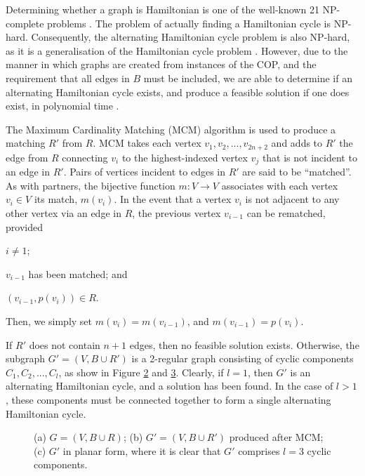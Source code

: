 \documentclass{elsarticle}
\begin{document}
Determining whether a graph is Hamiltonian is one of the well-known 21 NP-complete problems \cite{karp1972}. The problem of actually finding a Hamiltonian cycle is NP-hard. Consequently, the alternating Hamiltonian cycle problem is also NP-hard, as it is a generalisation of the Hamiltonian cycle problem \cite{haggkvist1977}. However, due to the manner in which graphs are created from instances of the COP, and the requirement that all edges in $B$ must be included, we are able to determine if an alternating Hamiltonian cycle exists, and produce a feasible solution if one does exist, in polynomial time \cite{hawa2018}.

The Maximum Cardinality Matching (MCM) algorithm is used to produce a matching $R'$ from $R$. MCM takes each vertex $v_1, v_2,...,v_{2n+2}$ and adds to $R'$ the edge from $R$ connecting $v_i$ to the highest-indexed vertex $v_j$ that is not incident to an edge in $R'$. Pairs of vertices incident to edges in $R'$ are said to be ``matched''. As with partners, the bijective function $m : V \to V$ associates with each vertex $v_i \in V$ its match, $m(v_i)$. In the event that a vertex $v_i$ is not adjacent to any other vertex via an edge in $R$, the previous vertex $v_{i-1}$ can be rematched, provided 
\begin{enumerate*}[label={(\alph*)}]
	\item $i \neq 1$;
	\item $v_{i-1}$ has been matched; and
	\item $(v_{i-1}, p(v_i)) \in R$.
\end{enumerate*} 
Then, we simply set $m(v_i) = m(v_{i-1})$, and $m(v_{i-1}) = p(v_i)$.

If $R'$ does not contain $n+1$ edges, then no feasible solution exists. Otherwise, the subgraph $G'=(V, B \cup R')$ is a 2-regular graph consisting of cyclic components $C_1,C_2,...,C_l$, as show in Figure \ref{fig:matching} and \ref{fig:mps}. Clearly, if $l = 1$, then $G'$ is an alternating Hamiltonian cycle, and a solution has been found. In the case of $l > 1$, these components must be connected together to form a single alternating Hamiltonian cycle.

\begin{figure}[H]	
	\centering
	\begin{subfigure}[h]{0.3\textwidth}
		
		\caption{}
		\label{fig:threshold}
	\end{subfigure} \hspace{5mm}
	\begin{subfigure}[h]{0.3\textwidth}
		
		\caption{}
		\label{fig:matching}
	\end{subfigure} \hspace{5mm}
	\begin{subfigure}[h]{0.25\textwidth}
		
		\caption{}
		\label{fig:mps}
	\end{subfigure}
	\caption{(a) $G = (V, B\cup R)$; (b) $G'=(V, B \cup R')$ produced after MCM; (c) $G'$ in planar form, where it is clear that $G'$ comprises $l = 3$ cyclic components.}
	\label{fig:mcm}
\end{figure}
\end{document}
